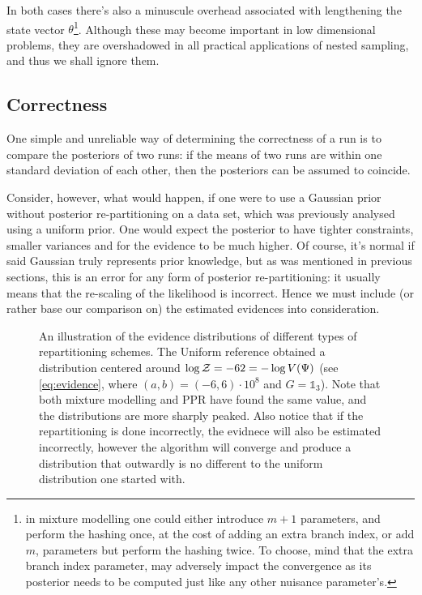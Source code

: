 \documentclass[usenatbib]{mnras}
\begin{document}
In both cases there's also a minuscule overhead associated with
lengthening the state vector \(\theta\)\footnote{in mixture modelling one could either introduce \(m+1\)
parameters, and perform the hashing once, at the cost of adding an
extra branch index, or add \(m\), parameters but perform the hashing
twice. To choose, mind that the extra branch index parameter, may
adversely impact the convergence as its posterior needs to be computed
just like any other nuisance parameter's.}.  Although these may
become important in low dimensional problems, they are overshadowed
in all practical applications of nested sampling, and thus we shall
ignore them.

\subsection{Correctness}
\label{sec:org5a40624}
One simple and unreliable way of determining the correctness of a
run is to compare the posteriors of two runs: if the means of two
runs are within one standard deviation of each other, then the
posteriors can be assumed to coincide.

Consider, however, what would happen, if one were to use a Gaussian
prior without posterior re-partitioning on a data set, which was
previously analysed using a uniform prior. One would expect the
posterior to have tighter constraints, smaller variances and for
the evidence to be much higher. Of course, it's normal if said
Gaussian truly represents prior knowledge, but as was mentioned in
previous sections, this is an error for any form of posterior
re-partitioning: it usually means that the re-scaling of the
likelihood is incorrect. Hence we must include (or rather base our
comparison on) the estimated evidences into consideration.

\begin{figure}

\caption{\label{orgf8347de}
An illustration of the evidence distributions of different types of repartitioning schemes. The Uniform reference obtained a distribution centered around \(\log {\cal Z} = -62 = - \log V(\Psi)\) (see \autoref{eq:evidence}, where \((a,b)=(-6, 6)\cdot 10^{8}\) and \(G=\mathds{1}_{3}\)). Note that both mixture modelling and PPR have found the same value, and the distributions are more sharply peaked. Also notice that if the repartitioning is done incorrectly, the evidnece will also be estimated incorrectly, however the algorithm will converge and produce a distribution that outwardly is no different to the uniform distribution one started with.}
\end{figure}
\end{document}
